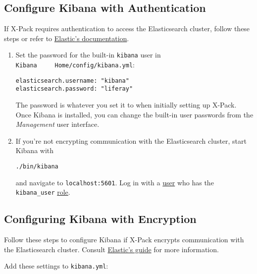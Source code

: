 \subsection{Configure Kibana with
Authentication}\label{configure-kibana-with-authentication-1}

If X-Pack requires authentication to access the Elasticsearch cluster,
follow these steps or refer to
\href{https://www.elastic.co/guide/en/kibana/6.1/monitoring-xpack-kibana.html}{Elastic's
documentation}.

\begin{enumerate}
\def\labelenumi{\arabic{enumi}.}
\item
  Set the password for the built-in \texttt{kibana} user in
  \texttt{Kibana\ \ \ \ \ Home/config/kibana.yml}:

\begin{verbatim}
elasticsearch.username: "kibana"
elasticsearch.password: "liferay"
\end{verbatim}

  The password is whatever you set it to when initially setting up
  X-Pack. Once Kibana is installed, you can change the built-in user
  passwords from the \emph{Management} user interface.
\item
  If you're not encrypting communication with the Elasticsearch cluster,
  start Kibana with

\begin{verbatim}
./bin/kibana
\end{verbatim}

  and navigate to \texttt{localhost:5601}. Log in with a
  \href{https://www.elastic.co/guide/en/x-pack/6.1/native-realm.html\#native-add}{user}
  who has the \texttt{kibana\_user}
  \href{https://www.elastic.co/guide/en/x-pack/6.1/built-in-roles.html}{role}.
\end{enumerate}

\subsection{Configuring Kibana with
Encryption}\label{configuring-kibana-with-encryption-1}

Follow these steps to configure Kibana if X-Pack encrypts communication
with the Elasticsearch cluster. Consult
\href{https://www.elastic.co/guide/en/kibana/6.2/using-kibana-with-security.html\#using-kibana-with-security}{Elastic's
guide} for more information.

Add these settings to \texttt{kibana.yml}:

